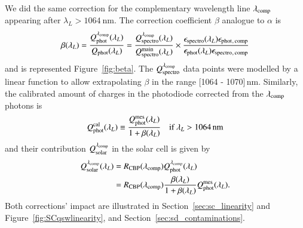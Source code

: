 We did the same correction for the complementary wavelength line $\lambda_{\rm comp}$ appearing after $\lambda_L > \SI{1064}{\nm}$. The correction coefficient $\beta$ analogue to $\alpha$ is
\begin{equation}
    \beta(\lambda_L) = \frac{Q_{\mathrm{phot}}^{\lambda_{\rm comp}}(\lambda_L)}{Q_{\mathrm{phot}}(\lambda_L)} = \frac{Q_{\mathrm{spectro}}^{\lambda_{\rm comp}}(\lambda_L)}{Q_{\mathrm{spectro}}^{\mathrm{main}}(\lambda_L)} \times \frac{\epsilon_{\mathrm{spectro}}(\lambda_L)\epsilon_{\mathrm{phot}}{}_{\mathrm{, \, comp}}}{\epsilon_{\mathrm{phot}}(\lambda_L)\epsilon_{\mathrm{spectro}}{}_{\mathrm{, \, comp}}} 
    \label{eq:beta}
\end{equation}
and is represented Figure~\ref{fig:beta}. The $Q_{\mathrm{spectro}}^{\lambda_{\rm comp}}$ data points were modelled by a linear function to allow extrapolating $\beta$ in the range [1064 - 1070]\,nm. Similarly, the calibrated amount of charges in the photodiode corrected from the $\lambda_{\rm comp}$ photons is
\begin{equation}
        Q_{\mathrm{phot}}^{\mathrm{cal}}(\lambda_L) \equiv  \frac{Q_{\mathrm{phot}}^{\mathrm{mes}}(\lambda_L)}{1 + \beta(\lambda_L)} \quad\text{if}\ \lambda_L > \SI{1064}{\nano\meter}
        \label{eq:qphot_cal1064}
\end{equation}
and their contribution $Q_{\mathrm{solar}}^{\lambda_{\rm comp}}$ in the solar cell is given by
\begin{equation}
\begin{aligned}
    Q_{\mathrm{solar}}^{\lambda_{\rm comp}}(\lambda_L) & = R_{\mathrm{CBP}}(\lambda_{\rm comp})  Q_{\mathrm{phot}}^{\lambda_{\rm comp}}(\lambda_L) \\ 
    & = R_{\mathrm{CBP}}(\lambda_{\rm comp}) \frac{ \beta(\lambda_L) }{1+ \beta(\lambda_L)} Q_{\mathrm{phot}}^{\mathrm{mes}}(\lambda_L).
    \label{eq:qsolar_cal1064}
\end{aligned}
\end{equation}
Both corrections' impact are illustrated in Section~\ref{sec:sc_linearity} and Figure~\ref{fig:SCqswlinearity}, and Section~\ref{sec:sd_contaminations}.


